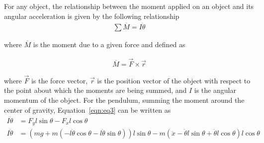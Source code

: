 \documentclass{notes}
\begin{document}
 \subsection{}
 
 
 For any object, the relationship between the moment applied on an object and its angular acceleration is given by the following relationship
 \begin{align}
   \sum \overline{M} = I \ddot{\theta}\label{eqn:eq3}
 \end{align}
 
 where $\overline{M}$ is the moment due to a given force and defined as 
 
 \begin{align*}
   \overline{M} = \vec{F} \times \vec{r}
 \end{align*}
 
 where $\vec{F}$ is the force vector, $\vec{r}$ is the position vector of the object with respect to the point about which the moments are being summed, and $I$ is the angular momentum of the object. For the pendulum, summing the moment around the center of gravity, Equation~\ref{eqn:eq3} can be written as
 \begin{align*}
   I\ddot{\theta} & = F_yl\sin\theta - F_xl\cos\theta \\
   I\ddot{\theta} & = (mg + m(-l\ddot{\theta}\cos\theta - l\ddot{\theta}\sin\theta))l\sin\theta 
   -m(\ddot{x} - \ddot{\theta}l\sin\theta + \ddot{\theta}l\cos\theta)l\cos\theta
 \end{align*}
\end{document}
